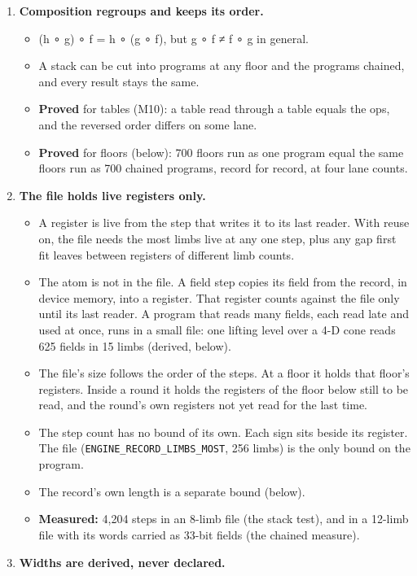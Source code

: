 \begin{enumerate}
\item \textbf{Composition regroups and keeps its order.}

\begin{itemize}
\item (h ∘ g) ∘ f = h ∘ (g ∘ f), but g ∘ f ≠ f ∘ g in general.
\item A stack can be cut into programs at any floor and the programs chained, and every result stays the same.
\item \textbf{Proved} for tables (M10): a table read through a table equals the ops, and the reversed order differs on some lane.
\item \textbf{Proved} for floors (below): 700 floors run as one program equal the same floors run as 700 chained programs, record for record, at four lane counts.
\end{itemize}
\item \textbf{The file holds live registers only.}

\begin{itemize}
\item A register is live from the step that writes it to its last reader. With reuse on, the file needs the most limbs live at any one step, plus any gap first fit leaves between registers of different limb counts.
\item The atom is not in the file. A field step copies its field from the record, in device memory, into a register. That register counts against the file only until its last reader. A program that reads many fields, each read late and used at once, runs in a small file: one lifting level over a 4-D cone reads 625 fields in 15 limbs (derived, below).
\item The file's size follows the order of the steps. At a floor it holds that floor's registers. Inside a round it holds the registers of the floor below still to be read, and the round's own registers not yet read for the last time.
\item The step count has no bound of its own. Each sign sits beside its register. The file (\texttt{ENGINE\_\allowbreak{}RECORD\_\allowbreak{}LIMBS\_\allowbreak{}MOST}, 256 limbs) is the only bound on the program.
\item The record's own length is a separate bound (below).
\item \textbf{Measured:} 4,204 steps in an 8-limb file (the stack test), and in a 12-limb file with its words carried as 33-bit fields (the chained measure).
\end{itemize}
\item \textbf{Widths are derived, never declared.}


\end{enumerate}
